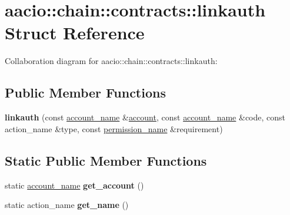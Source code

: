 \hypertarget{structaacio_1_1chain_1_1contracts_1_1linkauth}{}\section{aacio\+:\+:chain\+:\+:contracts\+:\+:linkauth Struct Reference}
\label{structaacio_1_1chain_1_1contracts_1_1linkauth}


Collaboration diagram for aacio\+:\+:chain\+:\+:contracts\+:\+:linkauth\+:
\subsection*{Public Member Functions}
\begin{DoxyCompactItemize}
\item 
\mbox{\label{structaacio_1_1chain_1_1contracts_1_1linkauth_af8e2ce959bcb89770fd8421fe7884cd9}} 
{\bfseries linkauth} (const \mbox{\hyperlink{structaacio_1_1chain_1_1name}{account\+\_\+name}} \&\mbox{\hyperlink{structaccount}{account}}, const \mbox{\hyperlink{structaacio_1_1chain_1_1name}{account\+\_\+name}} \&code, const action\+\_\+name \&type, const \mbox{\hyperlink{structaacio_1_1chain_1_1name}{permission\+\_\+name}} \&requirement)
\end{DoxyCompactItemize}
\subsection*{Static Public Member Functions}
\begin{DoxyCompactItemize}
\item 
\mbox{\label{structaacio_1_1chain_1_1contracts_1_1linkauth_aac455694a2d72c0f7955775fdec60796}} 
static \mbox{\hyperlink{structaacio_1_1chain_1_1name}{account\+\_\+name}} {\bfseries get\+\_\+account} ()
\item 
\mbox{\label{structaacio_1_1chain_1_1contracts_1_1linkauth_a6be271716ce8009e81b77a1d2e1f74a9}} 
static action\+\_\+name {\bfseries get\+\_\+name} ()
\end{DoxyCompactItemize}
